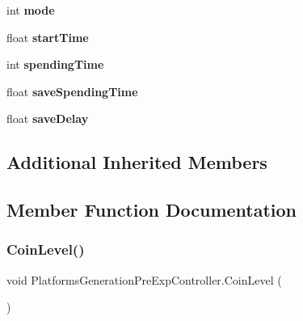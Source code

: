 \begin{DoxyCompactItemize}
\item 
\mbox{\label{class_platforms_generation_pre_exp_controller_ac73ef0a0901eea657175c7b2cea8267c}} 
int {\bfseries mode}
\item 
\mbox{\label{class_platforms_generation_pre_exp_controller_af80c080c21bc52a575e0e84d2e76dc82}} 
float {\bfseries start\+Time}
\item 
\mbox{\label{class_platforms_generation_pre_exp_controller_a3f055910a27aeae83206808cf282feb6}} 
int {\bfseries spending\+Time}
\item 
\mbox{\label{class_platforms_generation_pre_exp_controller_a3ed8a5d89ec18610644a06f82c292cff}} 
float {\bfseries save\+Spending\+Time}
\item 
\mbox{\label{class_platforms_generation_pre_exp_controller_ac50ec23e5a241b462c81401db4ff21f9}} 
float {\bfseries save\+Delay}
\end{DoxyCompactItemize}
\subsection*{Additional Inherited Members}


\subsection{Member Function Documentation}
\mbox{\label{class_platforms_generation_pre_exp_controller_aa213ed76246b6ad719c7eabc6a25aba5}} 
\subsubsection{\texorpdfstring{Coin\+Level()}{CoinLevel()}}
{\footnotesize\ttfamily void Platforms\+Generation\+Pre\+Exp\+Controller.\+Coin\+Level (\begin{DoxyParamCaption}{ }\end{DoxyParamCaption})\hspace{0.3cm}{\ttfamily [private]}}

